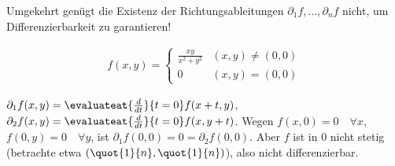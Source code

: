 \begin{achtung*}
    Umgekehrt genügt die Existenz der Richtungsableitungen \( \partial_1 f,\dotsc, \partial_n f \) nicht, um Differenzierbarkeit zu garantieren!
    \begin{beispiel*}
        \begin{align*}
            f(x,y)=\begin{cases}
                \frac{xy}{x^2+y^2}&(x,y)\neq (0,0)\\
                0 &(x,y)=(0,0)
            \end{cases}
        \end{align*}
    \end{beispiel*}
    \( \partial_1 f(x,y)=\evaluateat{\frac{d}{dt}}{t=0}f(x+t,y) \), \( \partial_2 f(x,y)=\evaluateat{\frac{d}{dt}}{t=0} f(x,y+t) \). Wegen \( f(x,0)=0 \quad \forall x \), \( f(0,y)=0\quad \forall y \), ist \( \partial_1 f(0,0)=0=\partial_2 f(0,0) \). Aber \( f  \) ist in \( 0 \) nicht stetig (betrachte etwa \( (\quot{1}{n},\quot{1}{n}) \)), also nicht differenzierbar.
\end{achtung*}




